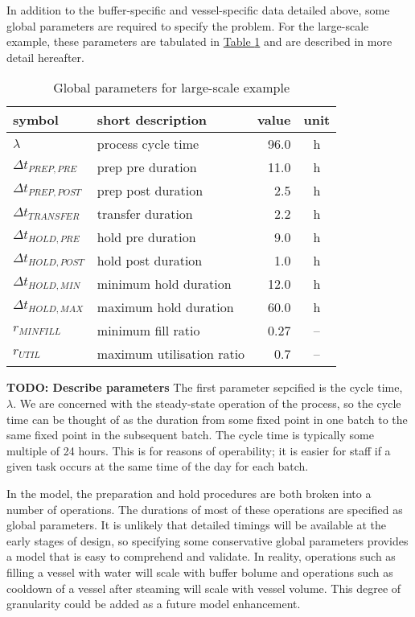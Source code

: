 In addition to the buffer-specific and vessel-specific data detailed above,
some global parameters are required to specify the problem.
For the large-scale example, these parameters are tabulated in
\hyperref[tbl.parameters]{Table \ref*{tbl.parameters}} and are described in
more detail hereafter.
\begin{table}[h!]
    \centering
    \caption{Global parameters for large-scale example}
    \label{tbl.parameters}
    \begin{tabular}{l | l | r | c}
        symbol & short description & value & unit\\ \hline
        $\lambda$ & process cycle time & 96.0 & h\\
        $\Delta t_{\mathit{PREP,PRE}}$ & prep pre duration & 11.0 & h\\
        $\Delta t_{\mathit{PREP,POST}}$ & prep post duration & 2.5 & h\\
        $\Delta t_{\mathit{TRANSFER}}$ & transfer duration & 2.2 & h\\
        $\Delta t_{\mathit{HOLD,PRE}}$ & hold pre duration & 9.0 & h\\
        $\Delta t_{\mathit{HOLD,POST}}$ & hold post duration & 1.0 & h\\
        $\Delta t_{\mathit{HOLD,MIN}}$ & minimum hold duration & 12.0 & h\\
        $\Delta t_{\mathit{HOLD,MAX}}$ & maximum hold duration & 60.0 & h\\
        $r_{\mathit{MINFILL}}$ & minimum fill ratio & 0.27 & --\\
        $r_{\mathit{UTIL}}$ & maximum utilisation ratio & 0.7 & --\\
    \end{tabular}
\end{table}

\textbf{TODO: Describe parameters}
The first parameter sepcified is the cycle time, $\lambda$.  We are concerned
with the steady-state operation of the process, so the cycle time can be
thought of as the duration from some fixed point in one batch to the same
fixed point in the subsequent batch.
The cycle time is typically some multiple of 24 hours.
This is for reasons of operability; it is easier for staff if a given task
occurs at the same time of the day for each batch.

In the model, the preparation and hold procedures are both broken into a number
of operations.
The durations of most of these operations are specified as global parameters.
It is unlikely that detailed timings will be available at the early stages of
design, so specifying some conservative global parameters provides a model that
is easy to comprehend and validate.
In reality, operations such as filling a vessel with water will scale with
buffer bolume and operations such as cooldown of a vessel after steaming will
scale with vessel volume.
This degree of granularity could be added as a future model enhancement.


